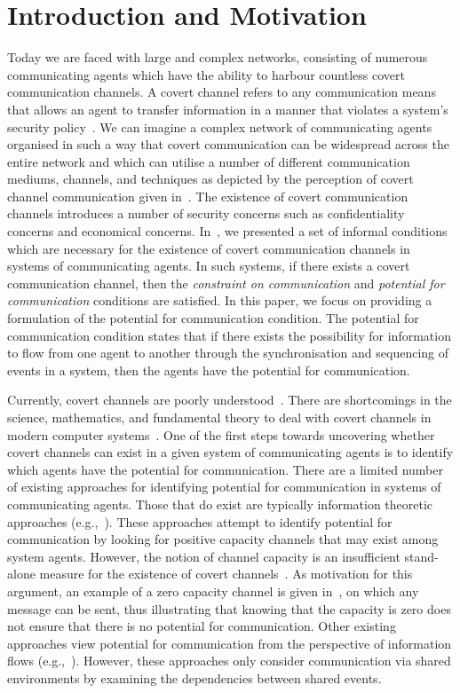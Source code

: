 \documentclass[copyright,creativecommons]{eptcs}
\makeatletter
\newcommand{\eg}{\textrm{e.g.,}\@\xspace}
\newcommand{\COCemph}{\emph{constraint on communication}\@\xspace}
\newcommand{\PFCemph}{\emph{potential for communication}\@\xspace}
\newcommand{\PFC}{potential for communication\@\xspace}
\newcommand{\soca}{system of communicating agents\@\xspace}
\newcommand{\socas}{systems of communicating agents\@\xspace}
\makeatother
\begin{document}
\section{Introduction and Motivation} 
\label{sec:introduction}
\vspace{-0.1in}
Today we are faced with large and complex networks, consisting of numerous communicating agents which have the ability to harbour countless covert communication channels. A covert channel refers to any communication means that allows an agent to transfer information in a manner that violates a system's security policy~\cite{DoD1985aa}. We can imagine a complex network of communicating agents organised in such a way that covert communication can be widespread across the entire network and which can utilise a number of different communication mediums, channels, and techniques as depicted by the perception of covert channel communication given in~\cite{Jaskolka2011aa}. The existence of covert communication channels introduces a number of security concerns such as confidentiality concerns and economical concerns. In~\cite{Jaskolka2012aa}, we presented a set of informal conditions which are necessary for the existence of covert communication channels in \socas. In such systems, if there exists a covert communication channel, then the \COCemph and \PFCemph conditions are satisfied. In this paper, we focus on providing a formulation of the \PFC condition. The \PFC condition states that if there exists the possibility for information to flow from one agent to another through the synchronisation and sequencing of events in a system, then the agents have the potential for communication. 

Currently, covert channels are poorly understood~\cite{Jaskolka2011aa}. There are shortcomings in the science, mathematics, and fundamental theory to deal with covert channels in modern computer systems~\cite{DoHS2009aa}. One of the first steps towards uncovering whether covert channels can exist in a given \soca is to identify which agents have the \PFC. There are a limited number of existing approaches for identifying \PFC in \socas. Those that do exist are typically information theoretic approaches (\eg~\cite{Gianvecchio2007aa,Giles2002aa,Giles1999aa,Helouet2010aa,Lowe2002aa,Martin2006aa,Millen1987aa,Millen1989aa,Moskowitz1994aa}). These approaches attempt to identify \PFC by looking for positive capacity channels that may exist among system agents. However, the notion of channel capacity is an insufficient stand-alone measure for the existence of covert channels~\cite{Moskowitz1994aa}. As motivation for this argument, an example of a zero capacity channel is given in~\cite{Moskowitz1994aa}, on which any message can be sent, thus illustrating that knowing that the capacity is zero does not ensure that there is no \PFC. Other existing approaches view \PFC from the perspective of information flows (\eg~\cite{Kemmerer1983aa,Kemmerer1991aa}). However, these approaches only consider communication via shared environments by examining the dependencies between shared events. 
\end{document}

